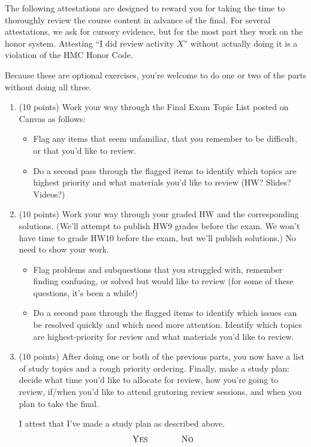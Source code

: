 \documentclass[12 pt, letterpaper]{hmcpset}
\begin{document}
\pagebreak

\begin{problem}
The following attestations are designed to reward you for taking the time to thoroughly review the course content in advance of the final. For several attestations, we ask for cursory evidence, but for the most part they work on the honor system. Attesting ``I did review activity $X$'' without actually doing it is a violation of the HMC Honor Code. 

Because these are optional exercises, you're welcome to do one or two of the parts without doing all three.

\begin{enumerate}
    \item (10 points) Work your way through the Final Exam Topic List posted on Canvas as follows:
    \begin{itemize}
        \item Flag any items that seem unfamiliar, that you remember to be difficult, or that you'd like to review. 
        \item Do a second pass through the flagged items to identify which topics are highest priority and what materials you'd like to review (HW? Slides? Videos?) 
    \end{itemize}

    \item (10 points) Work your way through your graded HW and the corresponding solutions. (We'll attempt to publish HW9 grades before the exam. We won't have time to grade HW10 before the exam, but we'll publish solutions.) No need to show your work.
    \begin{itemize}
        \item Flag problems and subquestions that you struggled with, remember finding confusing, or solved but would like to review (for some of these questions, it's been a while!)
        \item Do a second pass through the flagged items to identify which issues can be resolved quickly and which need more attention. Identify which topics are highest-priority for review and what materials you'd like to review.
    \end{itemize}

    \item (10 points) After doing one or both of the previous parts, you now have a list of study topics and a rough priority ordering. Finally, make a study plan: decide what time you'd like to allocate for review, how you're going to review, if/when you'd like to attend grutoring review sessions, and when you plan to take the final.
    
    I attest that I've made a study plan as described above.
    \[
    	\textsc{Yes} \quad \quad \quad \quad \textsc{No}
    \]
\end{enumerate}
\end{problem}
\end{document}
